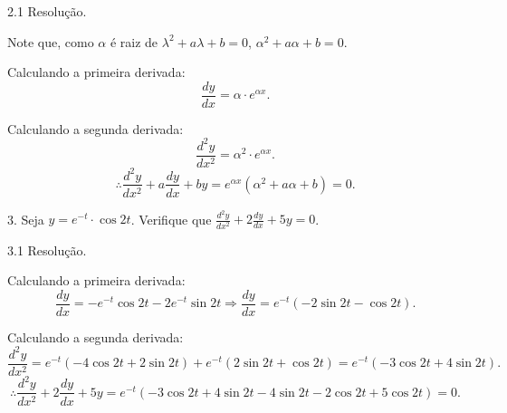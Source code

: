 \documentclass{article}
\begin{document}
{\begin{newpage}
\begin{flushleft}
2.1 Resolução.
\end{flushleft}
\par Note que, como $\alpha $ é raiz de $\lambda^{2} + a\lambda + b = 0$, $\alpha^{2} + a\alpha + b = 0$.
\par Calculando a primeira derivada:
\begin{equation*} \displaystyle{\frac{dy}{dx} = \alpha\cdot e^{\alpha x}} .\end{equation*}
\par Calculando a segunda derivada:
\begin{equation*} \displaystyle{\frac{d^{2}y}{dx^2} = \alpha^{2}\cdot e^{\alpha x}} .\end{equation*}
$$\therefore \displaystyle{\frac{d^{2}y}{dx^2} + a\frac{dy}{dx} + by = e^{\alpha x}(\alpha^{2} + a\alpha +b) = 0} .$$
\par
\vspace{0.3cm}
\begin{flushleft}
3. Seja $y=e^{-t}\cdot\cos{2t}$. Verifique que $\displaystyle{\frac{d^{2}y}{dx^2} + 2\frac{dy}{dx} + 5y = 0}$.
\end{flushleft}
\par
\vspace{0.3cm}
\begin{flushleft}
3.1 Resolução.
\end{flushleft}
\par Calculando a primeira derivada:
\begin{equation*} \displaystyle{\frac{dy}{dx} = -e^{-t}\cos{2t} - 2e^{-t}\sin{2t} \Rightarrow \frac{dy}{dx} = e^{-t}(-2\sin{2t} - \cos{2t})} .\end{equation*}
\par Calculando a segunda derivada:
\begin{equation*} \displaystyle{\frac{d^{2}y}{dx^2} = e^{-t}(-4\cos{2t} + 2\sin{2t}) + e^{-t}(2\sin{2t} + \cos{2t}) = e^{-t}(-3\cos{2t} + 4\sin{2t})} .\end{equation*}
$$\therefore \displaystyle{\frac{d^{2}y}{dx^2} + 2\frac{dy}{dx} + 5y = e^{-t}(-3\cos{2t} + 4\sin{2t} - 4\sin{2t} - 2\cos{2t} + 5\cos{2t}) = 0}.$$
\par
\vspace{0.3cm}

\end{newpage}}
\end{document}
